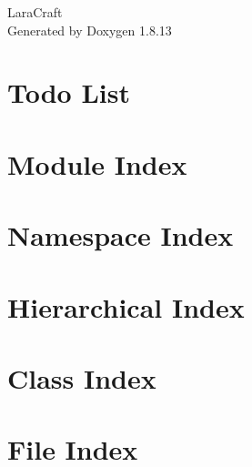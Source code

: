 \documentclass[twoside]{book}
\newcommand{\+}{\discretionary{\mbox{\scriptsize$\hookleftarrow$}}{}{}}
\newcommand{\clearemptydoublepage}{%
  \newpage{\pagestyle{empty}\cleardoublepage}%
}
\begin{document}
\hypersetup{pageanchor=false,
             bookmarksnumbered=true,
             pdfencoding=unicode
            }
\begin{titlepage}
\vspace*{7cm}
\begin{center}%
{\Large Lara\+Craft }\\
\vspace*{1cm}
{\large Generated by Doxygen 1.8.13}\\
\end{center}
\end{titlepage}
\clearemptydoublepage
{}
\tableofcontents
\clearemptydoublepage
{}
\hypersetup{pageanchor=true}

\chapter{Todo List}
\label{todo}

\chapter{Module Index}

\chapter{Namespace Index}

\chapter{Hierarchical Index}

\chapter{Class Index}

\chapter{File Index}

\end{document}
